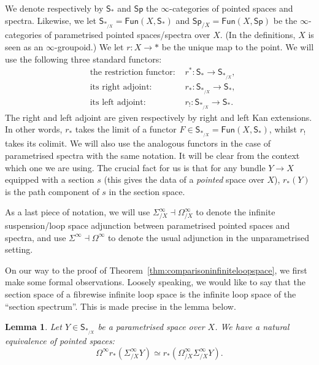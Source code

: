 \documentclass[a4paper]{amsart}
\newcommand{\lra}{\longrightarrow}
\theoremstyle{plain}
\newtheorem{lemma}[theorem]{Lemma}
\theoremstyle{definition}
\newcommand{\catS}{\mathsf{S}}
\newcommand{\catSp}{\mathsf{Sp}}
\newcommand{\catFun}{\mathsf{Fun}}
\begin{document}
We denote respectively by $\catS_*$ and $\catSp$ the $\infty$-categories of pointed spaces and spectra. Likewise, we let $\catS_{*_{/X}} = \catFun(X, \catS_*)$ and $\catSp_{/X} = \catFun(X, \catSp)$ be the $\infty$-categories of parametrised pointed spaces/spectra over $X$. (In the definitions, $X$ is seen as an $\infty$-groupoid.) We let $r \colon X \to *$ be the unique map to the point. We will use the following three standard functors:
\begin{align*}
    &\text{the restriction functor: }& r^* \colon \catS_* \lra \catS_{*_{/X}}, \\
    &\text{its right adjoint: }& r_* \colon \catS_{*_{/X}} \lra \catS_*, \\
    &\text{its left adjoint: }& r_! \colon \catS_{*_{/X}} \lra \catS_*.
\end{align*}
The right and left adjoint are given respectively by right and left Kan extensions. In other words, $r_*$ takes the limit of a functor $F \in \catS_{*_{/X}} = \catFun(X, \catS_*)$, whilst $r_!$ takes its colimit. We will also use the analogous functors in the case of parametrised spectra with the same notation. It will be clear from the context which one we are using. The crucial fact for us is that for any bundle $Y \to X$ equipped with a section $s$ (this gives the data of a \emph{pointed} space over $X$), $r_*(Y)$ is the path component of $s$ in the section space.

As a last piece of notation, we will use $\Sigma^\infty_{/X} \dashv \Omega^\infty_{/X}$ to denote the infinite suspension/loop space adjunction between parametrised pointed spaces and spectra, and use $\Sigma^\infty \dashv \Omega^\infty$ to denote the usual adjunction in the unparametrised setting.

\bigskip

On our way to the proof of Theorem~\ref{thm:comparisoninfiniteloopspace}, we first make some formal observations. Loosely speaking, we would like to say that the section space of a fibrewise infinite loop space is the infinite loop space of the ``section spectrum''. This is made precise in the lemma below.
\begin{lemma}\label{lemma:infiniteloopspacesectionspace}
Let $Y \in \catS_{*_{/X}}$ be a parametrised space over $X$. We have a natural equivalence of pointed spaces:
\[
    \Omega^\infty r_* (\Sigma^\infty_{/X} Y) \simeq r_* (\Omega^\infty_{/X} \Sigma^\infty_{/X} Y).
\]
\end{lemma}
\end{document}
